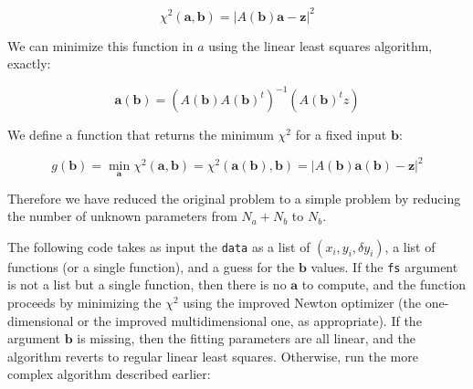 \documentclass[justified,sixbynine]{tufte-book}
\def\ft{\small\tt}
\theoremstyle{plain}%
\theoremstyle{definition}
\theoremstyle{remark}
\begin{document}
\begin{fullwidth}
\begin{equation}
\chi^2(\mathbf{a},\mathbf{b}) = \left| A(\mathbf{b}) \mathbf{a} - \mathbf{z} \right|^2
\end{equation}

We can minimize this function in $a$ using the linear least squares algorithm, exactly:

\begin{equation}
\mathbf{a}(\mathbf{b}) = (A(\mathbf{b}) A(\mathbf{b})^t)^{-1}(A(\mathbf{b})^t z)
\end{equation}

We define a function that returns the minimum $\chi^2$ for a fixed input $\mathbf{b}$:

\begin{equation}
g(\mathbf{b}) =
\min_{\mathbf{a}}
\chi^2(\mathbf{a},\mathbf{b}) =
\chi^2(\mathbf{a}(\mathbf{b}),\mathbf{b}) = \left|
A(\mathbf{b})\mathbf{a}(\mathbf{b}) - \mathbf{z}
\right|^2
\end{equation}

Therefore we have reduced the original problem to a simple problem by reducing the number of unknown parameters from $N_a+N_b$ to $N_b$.

The following code takes as input the {\ft data} as a list of $(x_i,y_i,\delta y_i)$, a list of functions (or a single function), and a guess for the $\mathbf{b}$ values. If the {\ft fs} argument is not a list but a single function, then there is no $\mathbf{a}$ to compute, and the function proceeds by minimizing the $\chi^2$ using the improved Newton optimizer (the one-dimensional or the improved multidimensional one, as appropriate). If the argument $\mathbf{b}$ is missing, then the fitting parameters are all linear, and the algorithm reverts to regular linear least squares. Otherwise, run the more complex algorithm described earlier:


\end{fullwidth}
\end{document}
